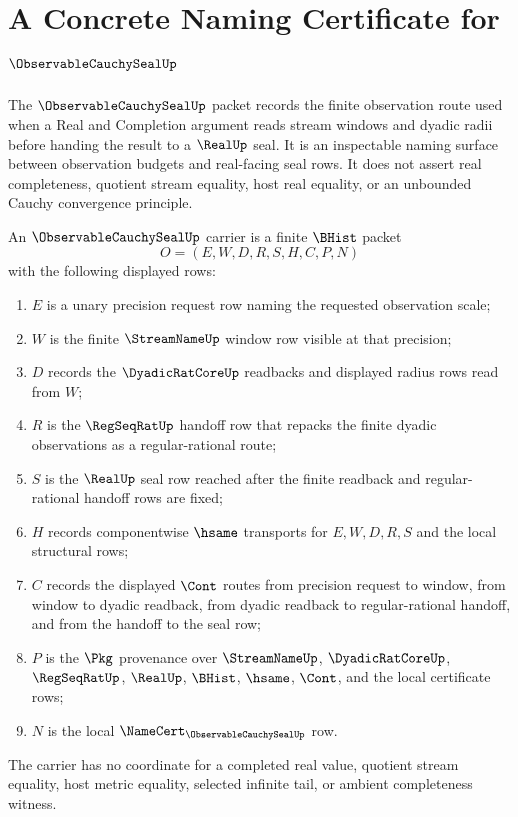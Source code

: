 \chapter{A Concrete Naming Certificate for $\ObservableCauchySealUp$}
\label{ch:concrete-instances-observablecauchyseal-namecert}

The $\ObservableCauchySealUp$ packet records the finite observation route used when a Real and Completion argument reads stream windows and dyadic radii before handing the result to a $\RealUp$ seal. It is an inspectable naming surface between observation budgets and real-facing seal rows. It does not assert real completeness, quotient stream equality, host real equality, or an unbounded Cauchy convergence principle.

\begin{definition}
\label{def:observable-cauchy-seal-carrier}
An $\ObservableCauchySealUp$ carrier is a finite $\BHist$ packet
$$
O=(E,W,D,R,S,H,C,P,N)
$$
with the following displayed rows:
\begin{enumerate}
\item $E$ is a unary precision request row naming the requested observation scale;
\item $W$ is the finite $\StreamNameUp$ window row visible at that precision;
\item $D$ records the $\DyadicRatCoreUp$ readbacks and displayed radius rows read from $W$;
\item $R$ is the $\RegSeqRatUp$ handoff row that repacks the finite dyadic observations as a regular-rational route;
\item $S$ is the $\RealUp$ seal row reached after the finite readback and regular-rational handoff rows are fixed;
\item $H$ records componentwise $\hsame$ transports for $E,W,D,R,S$ and the local structural rows;
\item $C$ records the displayed $\Cont$ routes from precision request to window, from window to dyadic readback, from dyadic readback to regular-rational handoff, and from the handoff to the seal row;
\item $P$ is the $\Pkg$ provenance over $\StreamNameUp$, $\DyadicRatCoreUp$, $\RegSeqRatUp$, $\RealUp$, $\BHist$, $\hsame$, $\Cont$, and the local certificate rows;
\item $N$ is the local $\NameCert_{\ObservableCauchySealUp}$ row.
\end{enumerate}
The carrier has no coordinate for a completed real value, quotient stream equality, host metric equality, selected infinite tail, or ambient completeness witness.
\end{definition}

